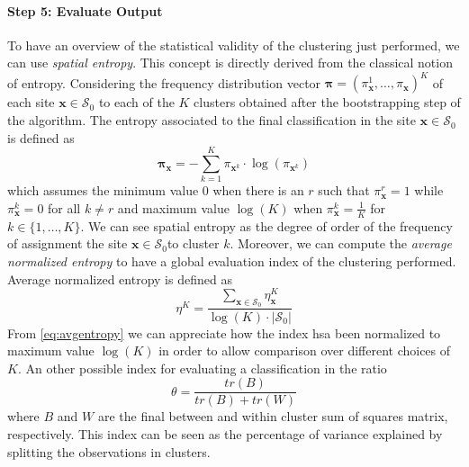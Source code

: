 \paragraph{Step 5: Evaluate Output} To have an overview of the statistical validity of the clustering just performed, we can use \textit{spatial entropy}. This concept is directly derived from the classical notion of entropy. Considering the frequency distribution vector $\boldsymbol{\pi}=(\pi_{\mathbf{x}}^1,\dots,\pi_{\mathbf{x}})^K$ of each site $\mathbf{x} \in \mathcal{S}_0$ to each of the $K$ clusters obtained after the bootstrapping step of the algorithm. The entropy associated to the final classification in the site $\mathbf{x}\in\mathcal{S}_0$ is defined as
\begin{equation}
\mathbf{\pi}_{\mathbf{x}}=-\sum_{k=1}^K\pi_{\mathbf{x}^k}\cdot \log(\pi_{\mathbf{x}^k})
\end{equation}
which assumes the minimum value 0 when there is an $r$ such that $\pi_{\mathbf{x}}^r=1$ while $\pi_{\mathbf{x}}^k=0$ for all $k\neq r$ and maximum value $\log(K)$ when $\pi_{\mathbf{x}}^k=\frac{1}{K}$ for $k\in\{1,\dots,K\}$. We can see spatial entropy as the degree of order of the frequency of assignment the site $\mathbf{x}\in\mathcal{S}_0$to cluster $k$. Moreover, we can compute the \textit{average normalized entropy} to have a global evaluation index of the clustering performed. Average normalized entropy is defined as
\begin{equation}
\label{eq:avgentropy}
    \eta^K=\frac{\sum_{\textbf{x}\in\mathcal{S}_0}\eta_{\mathbf{x}}^K}{\log(K)\cdot |\mathcal{S}_0|}
\end{equation}
From \ref{eq:avgentropy} we can appreciate how the index hsa been normalized to maximum value $\log(K)$ in order to allow comparison over different choices of $K$. An other possible index for evaluating a classification in the ratio
\begin{equation}
    \label{eq:theta}
    \theta=\frac{tr(B)}{tr(B)+tr(W)}
\end{equation}
where $B$ and $W$ are the final between and within cluster sum of squares matrix, respectively. This index can be seen as the percentage of variance explained by splitting the observations in clusters.

